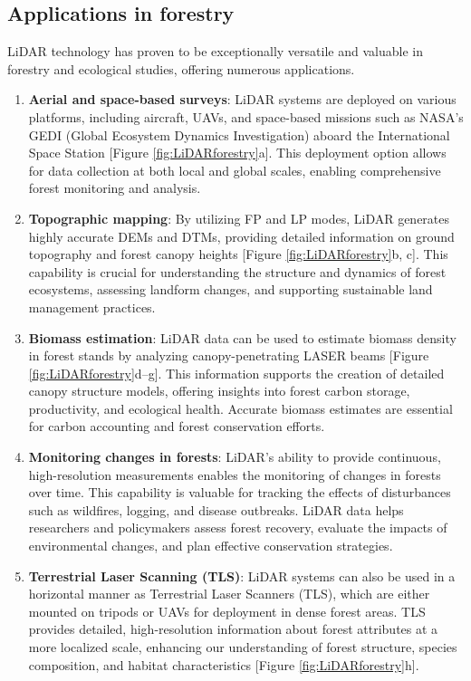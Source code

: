 \documentclass[
  12 pt,
]{Nemilov}
\begin{document}
\subsection{Applications in forestry}\label{applications-in-forestry}

LiDAR technology has proven to be exceptionally versatile and valuable in forestry and ecological studies, offering numerous applications.

\begin{enumerate}
\def\labelenumi{\arabic{enumi}.}
\item
  \textbf{Aerial and space-based surveys}: LiDAR systems are deployed on various platforms, including aircraft, UAVs, and space-based missions such as NASA's GEDI (Global Ecosystem Dynamics Investigation) aboard the International Space Station {[}Figure \ref{fig:LiDARforestry}a{]}. This deployment option allows for data collection at both local and global scales, enabling comprehensive forest monitoring and analysis.
\item
  \textbf{Topographic mapping}: By utilizing FP and LP modes, LiDAR generates highly accurate DEMs and DTMs, providing detailed information on ground topography and forest canopy heights {[}Figure \ref{fig:LiDARforestry}b, c{]}. This capability is crucial for understanding the structure and dynamics of forest ecosystems, assessing landform changes, and supporting sustainable land management practices.
\item
  \textbf{Biomass estimation}: LiDAR data can be used to estimate biomass density in forest stands by analyzing canopy-penetrating LASER beams {[}Figure \ref{fig:LiDARforestry}d--g{]}. This information supports the creation of detailed canopy structure models, offering insights into forest carbon storage, productivity, and ecological health. Accurate biomass estimates are essential for carbon accounting and forest conservation efforts.
\item
  \textbf{Monitoring changes in forests}: LiDAR's ability to provide continuous, high-resolution measurements enables the monitoring of changes in forests over time. This capability is valuable for tracking the effects of disturbances such as wildfires, logging, and disease outbreaks. LiDAR data helps researchers and policymakers assess forest recovery, evaluate the impacts of environmental changes, and plan effective conservation strategies.
\item
  \textbf{Terrestrial Laser Scanning (TLS)}: LiDAR systems can also be used in a horizontal manner as Terrestrial Laser Scanners (TLS), which are either mounted on tripods or UAVs for deployment in dense forest areas. TLS provides detailed, high-resolution information about forest attributes at a more localized scale, enhancing our understanding of forest structure, species composition, and habitat characteristics {[}Figure \ref{fig:LiDARforestry}h{]}.
\end{enumerate}
\end{document}
